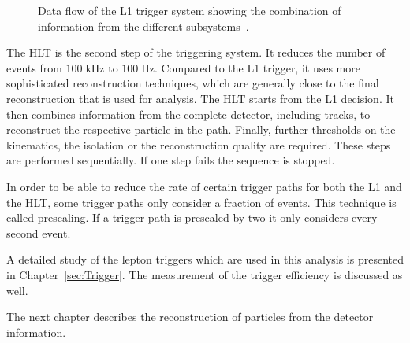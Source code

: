 \begin{figure}[htbp!]
  \begin{center}

\caption{ Data flow of the L1 trigger system showing the combination of information from the different subsystems~\cite{Tapper:2013yva}.
  \label{fig:det_Trigger}}
  \end{center}
\end{figure}

The HLT is the second step of the triggering system. It reduces the number of events from $100 \; \si{\kilo \hertz}$ to $100 \; \si{\hertz}$.
Compared to the L1 trigger, it uses more sophisticated reconstruction techniques, which are generally close to the final reconstruction that is used for analysis.
The HLT starts from the L1 decision. It then combines information from the complete detector, including tracks, to reconstruct the respective particle in the path.
Finally, further thresholds on the kinematics, the isolation or the reconstruction quality are required. 
These steps are performed sequentially. If one step fails the sequence is stopped. 

In order to be able to reduce the rate of certain trigger paths for both the L1 and the HLT, some trigger paths only consider a fraction of events. This technique is called prescaling. If a trigger path is prescaled by two it only considers every second event.

A detailed study of the lepton triggers which are used in this analysis is presented in Chapter~\ref{sec:Trigger}. The measurement of the trigger efficiency is 
discussed as well.

The next chapter describes the reconstruction of particles from the detector information.

